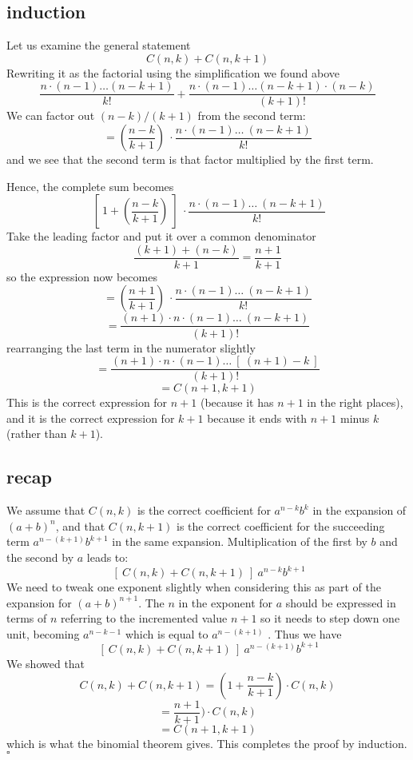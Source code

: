 \documentclass[11pt, oneside]{article}   	%
\begin{document}
\subsection*{induction}
Let us examine the general statement
\[ C(n,k) + C(n,k+1) \]
Rewriting it as the factorial using the simplification we found above
\[ \frac{n \cdot (n-1) \dots (n-k+1)}{k!} + \frac{n \cdot (n-1) \dots (n-k+1) \cdot (n-k)}{(k+1)!} \]
We can factor out $(n-k)/(k+1)$ from the second term:
\[ = (\frac{n-k}{k+1}) \ \cdot \frac{n \cdot (n-1) \dots \ (n-k+1) }{k!}  \]
and we see that the second term is that factor multiplied by the first term.

Hence, the complete sum becomes
\[ \ [ \ 1 + (\frac{n-k}{k+1})  \ ] \  \cdot \frac{n \cdot (n-1) \dots \ (n-k+1) }{k!}  \]
Take the leading factor and put it over a common denominator
\[ \frac{(k+1) + (n-k)}{k+1} = \frac{n+1}{k+1} \]
so the expression now becomes
\[ = ( \frac{n+1}{k+1} ) \  \cdot \frac{n \cdot (n-1) \dots \ (n-k+1) }{k!}  \]
\[ = \frac{(n+1) \cdot n \cdot (n-1) \dots \ (n-k+1) }{(k+1)!}  \]
rearranging the last term in the numerator slightly
\[ = \frac{(n+1) \cdot n \cdot (n-1) \dots \ [ \ (n+1)-k \ ] }{(k+1)!}  \]
\[ = C(n+1,k+1) \]
This is the correct expression for $n+1$ (because it has $n+1$ in the right places), and it is the correct expression for $k+1$ because it ends with $n+1$ minus $k$ (rather than $k+1$).  

\subsection*{recap}
We assume that $C(n,k)$ is the correct coefficient for $a^{n-k}b^k$ in the expansion of $(a+b)^n$, and that $C(n,k+1)$ is the correct coefficient for the succeeding term $a^{n-(k+1)}b^{k+1}$ in the same expansion.  Multiplication of the first by $b$ and the second by $a$ leads to:
\[ \ [ \ C(n,k) + C(n,k+1) \ ] \ a^{n-k}b^{k+1} \]
We need to tweak one exponent slightly when considering this as part of the  expansion for $(a+b)^{n+1}$.  The $n$ in the exponent for $a$ should be expressed in terms of $n$ referring to the incremented value $n+1$ so it needs to step down one unit, becoming $a^{n-k - 1}$ which is equal to $a^{n-(k+1)}$ .  Thus we have
\[ \ [ \ C(n,k) + C(n,k+1) \ ] \ a^{n-(k+1)}b^{k+1} \]
We showed that 
\[ C(n,k) + C(n,k+1) = (1 + \frac{n-k}{k+1}) \cdot  C(n,k) \]
\[ = \frac{n+1}{k+1}) \cdot  C(n,k) \]
\[ = C(n+1,k+1) \]
which is what the binomial theorem gives.  This completes the proof by induction.
$\square$
\end{document}
